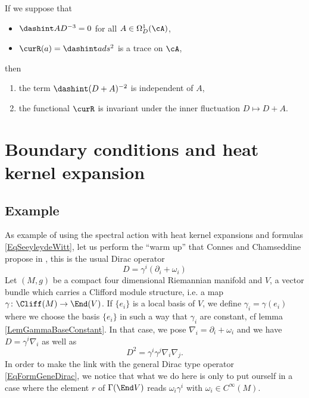 \begin{proposition}
If we suppose that 
\begin{itemize}
\item $\dashint AD^{-3}=0$ for all $A\in\Omega^1_D(\cA)$,
\item $\curR(a)=\dashint ads^2$ is a trace on $\cA$,
\end{itemize}
then 
\begin{enumerate}
\item the term $\dashint (D+A)^{-2}$ is independent of $A$,
\item the functional $\curR$ is invariant under the inner fluctuation $D\mapsto D+A$.
\end{enumerate}
\end{proposition}

\section{Boundary conditions and heat kernel expansion}			\label{SecGravBoundCC}

\subsection{Example}

As example of using the spectral action with heat kernel expansions and formulas \eqref{EqSeeyleydeWitt}, let us perform the ``warm up'' that Connes and Chamseddine propose in \cite{QGBoundaryTermsSpectralAction}, this is the usual Dirac operator
\begin{equation}		\label{EqFormgenDiracD}
D=\gamma^i(\partial_i+\omega_i)
\end{equation}
Let $(M,g)$ be a compact four dimensional Riemannian manifold and $V$, a vector bundle which carries a Clifford module structure, i.e. a map $\gamma\colon \Cliff(M)\to \End(V)$. If $\{ e_i \}$ is a local basis of $V$, we define $\gamma_i=\gamma(e_i)$ where we choose the basis $\{ e_i \}$ in such a way that $\gamma_i$ are constant, cf lemma \ref{LemGammaBaseConstant}. In that case, we pose $\nabla_i=\partial_i+\omega_i$ and we have $D=\gamma^i\nabla_i$ as well as
\[ 
  D^2=\gamma^i\gamma^j\nabla_i\nabla_j.
\]
In order to make the link with the general Dirac type operator \eqref{EqFormGeneDirac}, we notice that what we do here is only to put ourself in a case where the element $r$ of $\Gamma(\End V)$ reads $\omega_i\gamma^i$ with $\omega_i\in C^{\infty}(M)$.

